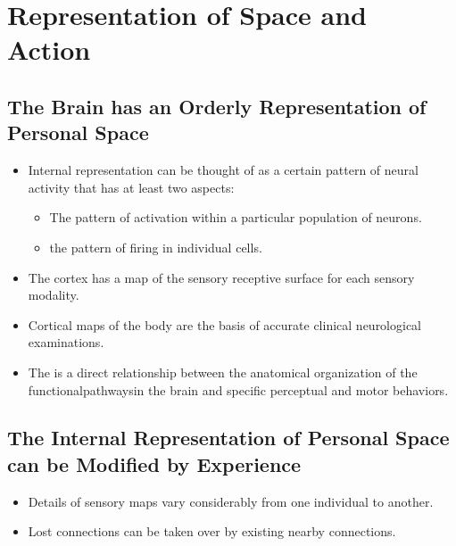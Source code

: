 \documentclass[12pt,a4paper]{article}
\begin{document}
\clearpage
\section{Representation of Space and Action}
\subsection{The Brain has an Orderly Representation of Personal Space}
\begin{itemize}
    \item Internal representation can be thought of as a certain pattern of neural activity that has at least two aspects:
        \begin{itemize}
            \item The pattern of activation within a particular population of neurons.
            \item the pattern of firing in individual cells.
        \end{itemize}
    \item The cortex has a map of the sensory receptive surface for each sensory modality.
    \item Cortical maps of the body are the basis of accurate clinical neurological examinations.
    \item The is a direct relationship between the anatomical organization of the functionalpathwaysin the brain and specific perceptual and motor behaviors.
\end{itemize}

\subsection{The Internal Representation of Personal Space can be Modified by Experience}
\begin{itemize}
    \item Details of sensory maps vary considerably from one individual to another.
    \item Lost connections can be taken over by existing nearby connections.
\end{itemize}
\end{document}
